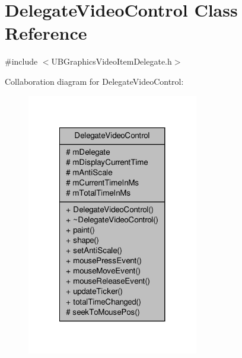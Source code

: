 \hypertarget{class_delegate_video_control}{\section{Delegate\-Video\-Control Class Reference}
\label{d6/dfb/class_delegate_video_control}
}


{\ttfamily \#include $<$U\-B\-Graphics\-Video\-Item\-Delegate.\-h$>$}



Collaboration diagram for Delegate\-Video\-Control\-:
\nopagebreak
\begin{figure}[H]
\begin{center}
\leavevmode
\includegraphics[width=212pt]{d5/db7/class_delegate_video_control__coll__graph}
\end{center}
\end{figure}
